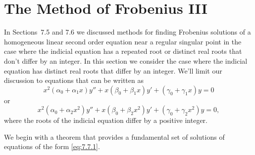 \section{The Method of Frobenius III}

\noindent
In Sections~7.5 and 7.6 we discussed methods for finding Frobenius solutions of a homogeneous linear
second order equation near a regular singular point in the case where the indicial equation has a
repeated root or distinct real roots that don't differ by an integer. In this section we consider
the case where the indicial equation has distinct real roots that differ by an integer. We'll limit
our discussion to equations that can be written as
\begin{equation}
  \label{eq:7.7.1}x^{2}(\alpha_{0}+\alpha_{1}x)y''+x(\beta_{0}+\beta_{1}x)y' +(\gamma_{0}+\gamma_{1}x)y=0
\end{equation}
or
\[
  x^{2}(\alpha_{0}+\alpha_{2}x^{2})y''+x(\beta_{0}+\beta_{2}x^{2})y' +(\gamma_{0}+\gamma_{2}x^{2})y=0,
\]
where the roots of the indicial equation differ by a positive integer.

We begin with a theorem that provides a fundamental set of solutions of equations of the form
\eqref{eq:7.7.1}.

